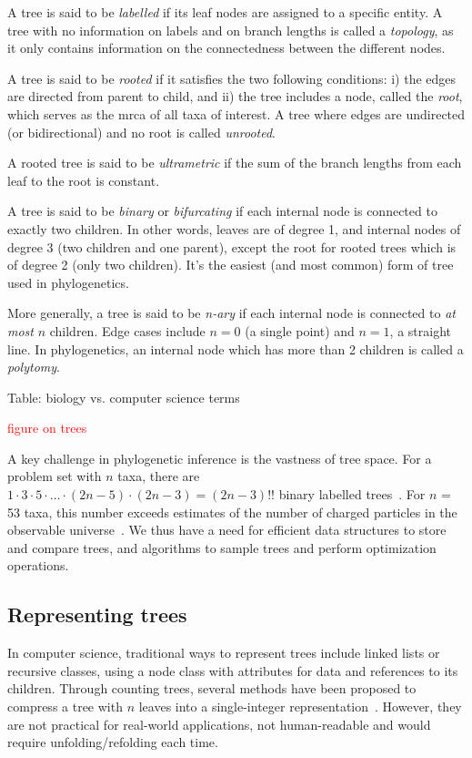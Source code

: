 A tree is said to be \textit{labelled} if its leaf nodes are assigned to a specific entity. A tree with no information on labels and on branch lengths is called a \textit{topology}, as it only contains information on the connectedness between the different nodes.

A tree is said to be \textit{rooted} if it satisfies the two following conditions: i) the edges are directed from parent to child, and ii) the tree includes a node, called the \textit{root}, which serves as the \gls{mrca} of all taxa of interest. A tree where edges are undirected (or bidirectional) and no root is called \textit{unrooted}.

A rooted tree is said to be \textit{ultrametric} if the sum of the branch lengths from each leaf to the root is constant.

A tree is said to be \textit{binary} or \textit{bifurcating} if each internal node is connected to exactly two children. In other words, leaves are of degree 1, and internal nodes of degree 3 (two children and one parent), except the root for rooted trees which is of degree 2 (only two children). It's the easiest (and most common) form of tree used in phylogenetics.

More generally, a tree is said to be \textit{n-ary} if each internal node is connected to \textit{at most} $n$ children. Edge cases include $n = 0$ (a single point) and $n = 1$, a straight line. In phylogenetics, an internal node which has more than 2 children is called a \textit{polytomy}.

Table: biology vs. computer science terms

\textcolor{red}{figure on trees}

A key challenge in phylogenetic inference is the vastness of tree space. For a problem set with $n$ taxa, there are $1\cdot3\cdot5\cdot\ldots\cdot (2n-5) \cdot (2n-3) = (2n-3)!!$ binary labelled trees~\cite{cavallisforza1967}. For $n$ = 53 taxa, this number exceeds estimates of the number of charged particles in the observable universe~\cite{eddington1946}. We thus have a need for efficient data structures to store and compare trees, and algorithms to sample trees and perform optimization operations.

\subsection{Representing trees}

In computer science, traditional ways to represent trees include linked lists or recursive classes, using a node class with attributes for data and references to its children. Through counting trees, several methods have been proposed to compress a tree with $n$ leaves into a single-integer representation~\cite{rotem1978, proskurowski1980, rohlf1983, palacios2022}. However, they are not practical for real-world applications, not human-readable and would require unfolding/refolding each time.

